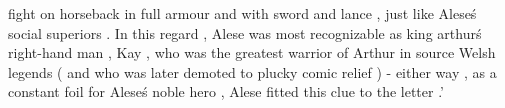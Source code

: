 fight on horseback in full armour and with sword and lance , just like Alese\'s social superiors . In this regard , Alese was most recognizable as king arthur\'s right-hand man , Kay , who was the greatest warrior of Arthur in source Welsh legends ( and who was later demoted to plucky comic relief ) - either way , as a constant foil for Alese\'s noble hero , Alese fitted this clue to the letter .'

